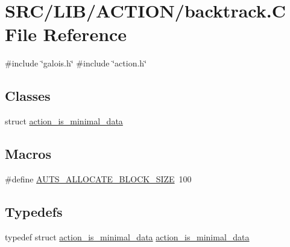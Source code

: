 \hypertarget{backtrack_8_c}{}\section{S\+R\+C/\+L\+I\+B/\+A\+C\+T\+I\+O\+N/backtrack.C File Reference}
\label{backtrack_8_c}
{\ttfamily \#include \char`\"{}galois.\+h\char`\"{}}\newline
{\ttfamily \#include \char`\"{}action.\+h\char`\"{}}\newline
\subsection*{Classes}
\begin{DoxyCompactItemize}
\item 
struct \mbox{\hyperlink{structaction__is__minimal__data}{action\+\_\+is\+\_\+minimal\+\_\+data}}
\end{DoxyCompactItemize}
\subsection*{Macros}
\begin{DoxyCompactItemize}
\item 
\#define \mbox{\hyperlink{backtrack_8_c_a91161d46c219929445a06b9c9fc3f9fa}{A\+U\+T\+S\+\_\+\+A\+L\+L\+O\+C\+A\+T\+E\+\_\+\+B\+L\+O\+C\+K\+\_\+\+S\+I\+ZE}}~100
\end{DoxyCompactItemize}
\subsection*{Typedefs}
\begin{DoxyCompactItemize}
\item 
typedef struct \mbox{\hyperlink{structaction__is__minimal__data}{action\+\_\+is\+\_\+minimal\+\_\+data}} \mbox{\hyperlink{backtrack_8_c_ac80b083745bb82fa4ed03aaba4150631}{action\+\_\+is\+\_\+minimal\+\_\+data}}
\end{DoxyCompactItemize}
